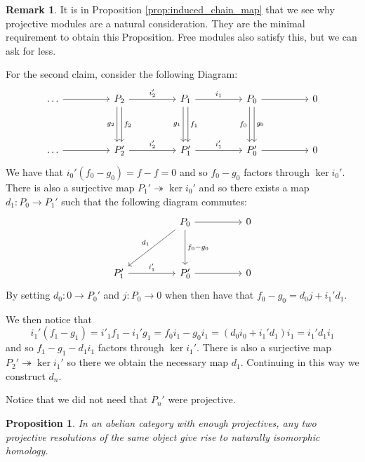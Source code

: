 \documentclass[12pt]{article}
\theoremstyle{plain}
\newtheorem{proposition}[thm]{Proposition}
\theoremstyle{definition}
\newtheorem{remark}[thm]{Remark}
\newcommand{\lto}{\longrightarrow}
\begin{document}
\begin{remark}\label{rmk:chain_homotopy}
It is in Proposition \ref{prop:induced_chain_map} that we see why projective modules are a natural consideration. They are the minimal requirement to obtain this Proposition. Free modules also satisfy this, but we can ask for less.

For the second claim, consider the following Diagram:
\begin{equation}
\begin{tikzcd}[column sep = huge, row sep = huge]
\hdots\arrow[r] & P_{2}\arrow[r,"{i_{2}'}"]\arrow[d,shift left,"{f_{2}}"]\arrow[d,shift right,swap,"{g_{2}}"] & P_1\arrow[r,"{i_1}"]\arrow[d,shift left,"{f_1}"]\arrow[d,shift right,swap,"{g_1}"] & P_{0}\arrow[d,shift left, "{g_0}"]\arrow[d,shift right,swap, "{f_0}"]\arrow[r] & 0\\
\hdots\arrow[r] & P_{2}'\arrow[r,"{i_{2}'}"] & P_1'\arrow[r,"{i_1'}"] & P_{0}'\arrow[r] & 0
\end{tikzcd}
\end{equation}
We have that $i_0'(f_0 - g_0) = f - f = 0$ and so $f_0 - g_0$ factors through $\operatorname{ker}i_0'$. There is also a surjective map $P_1' \twoheadrightarrow \operatorname{ker}i_0'$ and so there exists a map $d_1: P_0 \lto P_1'$ such that the following diagram commutes:
\begin{equation}
\begin{tikzcd}[column sep = huge, row sep = huge]
& P_{0}\arrow[d,"{f_0 - g_0}"]\arrow[r]\arrow[dl,swap,"{d_1}"] & 0\\
P_1'\arrow[r,"{i_1'}"] & P_{0}'\arrow[r] & 0
\end{tikzcd}
\end{equation}
By setting $d_0: 0 \lto P_0'$ and $j: P_0 \lto 0$ when then have that $f_0 - g_0 = d_0 j + i_1'd_1$.

We then notice that
\begin{equation}
i_1'(f_1 - g_1) = i'_1f_1 - i_1'g_1 = f_0i_1 - g_0i_1 = (d_0i_0 + i_1'd_1)i_1 = i_1'd_1i_1
\end{equation}
and so $f_1 - g_1 - d_1i_1$ factors through $\operatorname{ker}i_1'$. There is also a surjective map $P_2' \twoheadrightarrow \operatorname{ker}i_1'$ so there we obtain the necessary map $d_1$. Continuing in this way we construct $d_n$.

Notice that we did not need that $P_n'$ were projective.
\end{remark}
\begin{proposition}
In an abelian category with enough projectives, any two projective resolutions of the same object give rise to naturally isomorphic homology.
\end{proposition}
\end{document}
